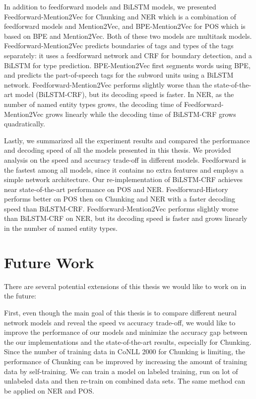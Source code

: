\documentclass{sfuthesis}
\begin{document}
In addition to feedforward models and BiLSTM models, we presented Feedforward-Mention2Vec for Chunking and NER which is a combination of feedforward models and Mention2Vec, and BPE-Mention2Vec for POS which is based on BPE and Mention2Vec. Both of these two models are multitask models. Feedforward-Mention2Vec predicts boundaries of tags and types of the tags separately: it uses a feedforward network and CRF for boundary detection, and a BiLSTM for type prediction. BPE-Mention2Vec first segments words using BPE, and predicts the part-of-speech tags for the subword units using a BiLSTM network. Feedforward-Mention2Vec performs slightly worse than the state-of-the-art model (BiLSTM-CRF), but its decoding speed is faster. In NER, as the number of named entity types grows, the decoding time of Feedforward-Mention2Vec grows linearly while the decoding time of BiLSTM-CRF grows quadratically. 

Lastly, we summarized all the experiment results and compared the performance and decoding speed of all the models presented in this thesis. We provided analysis on the speed and accuracy trade-off in different models. Feedforward is the fastest among all models, since it contains no extra features and employs a simple network architecture. Our re-implementation of BiLSTM-CRF achieves near state-of-the-art performance on POS and NER. Feedforward-History performs better on POS then on Chunking and NER with a faster decoding speed than BiLSTM-CRF. Feedforward-Mention2Vec performs slightly worse than BiLSTM-CRF on NER, but its decoding speed is faster and grows linearly in the number of named entity types.

\section{Future Work}
There are several potential extensions of this thesis we would like to work on in the future:

First, even though the main goal of this thesis is to compare different neural network models and reveal the speed vs accuracy trade-off, we would like to improve the performance of our models and minimize the accuracy gap between the our implementations and the state-of-the-art results, especially for Chunking. Since the number of training data in CoNLL 2000 for Chunking is limiting, the performance of Chunking can be improved by increasing the amount of training data by self-training. We can train a model on labeled training, run on lot of unlabeled data and then re-train on combined data sets. The same method can be applied on NER and POS.
\end{document}
